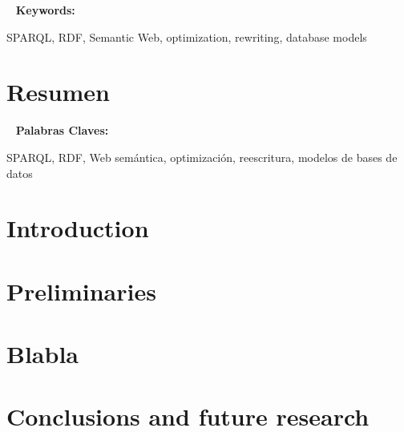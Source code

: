 \documentclass[12pt,reqno,oneside]{pucthesis}
\begin{document}
~\vfill
{\bf Keywords:} \parbox[t]{.75\textwidth}{
  SPARQL, RDF, Semantic Web, optimization, rewriting, database models
}


\chapter*{Resumen}
\label{ch:resumen}



~\vfill
{\bf Palabras Claves:} \parbox[t]{.75\textwidth}{
  SPARQL, RDF, Web sem\'antica, optimizaci\'on, reescritura, modelos de bases de datos
}


\cleardoublepage %




\chapter{Introduction}
\label{chapter:introduction}



\chapter{Preliminaries}
\label{chapter:preliminaries}



\chapter{Blabla}
\label{chapter:blabla}



\chapter{Conclusions and future research}
\label{chapter:conclusions}

\end{document}
